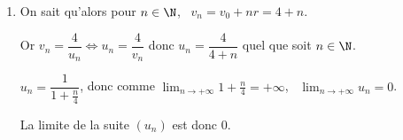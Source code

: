 \begin{enumerate}
\item %
On sait qu'alors pour $n \in \N$, \, $v_n = v_0 + nr = 4 + n$.

Or $v_n = \dfrac{4}{u_n} \iff u_n = \dfrac{4}{v_n}$ donc $u_n = \dfrac{4}{4 + n}$ quel que soit $n \in \N$.

$u_n = \dfrac{1}{1 + \frac{n}{4}}$, donc comme $\displaystyle\lim_{n \to + \infty} 1 + \frac{n}{4} = + \infty$, \, $\displaystyle\lim_{n \to + \infty} u_n = 0$.

La limite de la suite $\left(u_n\right)$ est donc $0$.
\end{enumerate}

\bigskip

